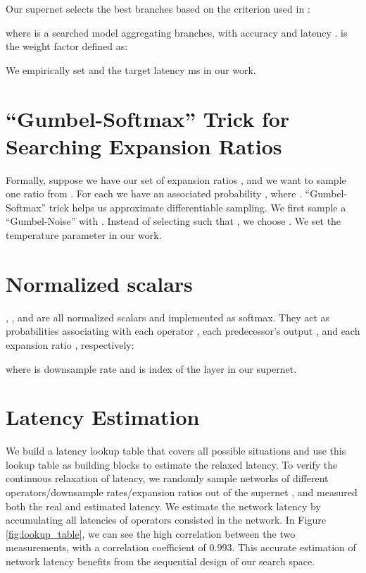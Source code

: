 \documentclass{article} \usepackage{iclr2020_conference,times}
\begin{document}
Our supernet selects the best  branches based on the criterion used in \citep{tan2019mnasnet}:

where  is a searched model aggregating  branches, with accuracy  and latency .  is the weight factor defined as:

We empirically set  and the target latency  ms in our work.

\section{``Gumbel-Softmax'' Trick for Searching Expansion Ratios} \vspace{-0.7em} \label{app:expansion_ratio}
Formally, suppose we have our set of expansion ratios , and we want to sample one ratio  from . For each  we have an associated probability , where . ``Gumbel-Softmax'' trick \citep{gumbel1954statistical,maddison2014sampling} helps us approximate differentiable sampling. We first sample a ``Gumbel-Noise''  with . Instead of selecting  such that , we choose . We set the temperature parameter  in our work. 


\section{Normalized scalars }\vspace{-0.7em} \label{app:abc}
, , and  are all normalized scalars and implemented as softmax. They act as probabilities associating with each operator , each predecessor's output , and each expansion ratio , respectively:

where  is downsample rate and  is index of the layer in our supernet.


\section{Latency Estimation}\vspace{-0.7em} \label{app:latency_estimation}

We build a latency lookup table that covers all possible situations and use this lookup table as building blocks to estimate the relaxed latency. To verify the continuous relaxation of latency, we randomly sample networks of different operators/downsample rates/expansion ratios out of the supernet , and measured both the real and estimated latency. We estimate the network latency by accumulating all latencies of operators consisted in the network. In Figure \ref{fig:lookup_table}, we can see the high correlation between the two measurements, with a correlation coefficient of 0.993. This accurate estimation of network latency benefits from the sequential design of our search space.
\end{document}
